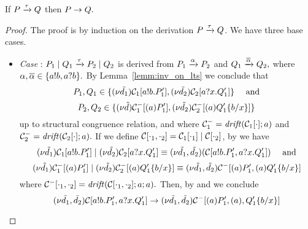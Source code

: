 \begin{lemma}{\label{lemm:tau_reduction}}
If $P\xrightarrow{\tau}Q$ then $P\rightarrow Q.$
\end{lemma}
\begin{proof}
The proof is by induction on the derivation $P\xrightarrow{\tau}Q$. We have three base cases.
\begin{itemize}
\item \emph{Case} : $P_1\;|\;Q_1\xrightarrow{\tau}P_2\;|\;Q_2$ is derived from $P_1\xrightarrow{\alpha}P_2$ and $Q_1\xrightarrow{\overline{\alpha}}Q_2,$ where $\alpha,\overline{\alpha}\in\{a!b, a?b\}.$ By Lemma~\ref{lemm:inv_on_lts} we conclude that
\[
P_1,Q_1\in\{(\nu \tilde {d_1})\mathcal{C}_1[a!b.P_1'], (\nu \tilde {d_2})\mathcal{C}_2[a?x.Q_1'] \} \quad\text{ and}
\]
\[
P_2,Q_2\in\{(\nu \tilde {d})\mathcal{C}_1^-[(a)P_1'], (\nu \tilde {d_2})\mathcal{C}_2^-[(a)Q_1'\{b/x\}]\}
\]
up to structural congruence relation, and where $\mathcal{C}_1^-=\mathit {drift}(\mathcal{C}_1[\cdot]; a)$ and $\mathcal{C}_2^-=\mathit {drift}(\mathcal{C}_2[\cdot]; a).$
If we define $\mathcal{C}[\cdot_1, \cdot_2]=\mathcal{C}_1[\cdot_1]\;|\; \mathcal{C}[\cdot_2]$, by  we have
 \[
 (\nu \tilde {d_1})\mathcal{C}_1[a!b.P_1']\;|\; (\nu \tilde {d_2})\mathcal{C}_2[a?x.Q_1'] \equiv (\nu \tilde {d_1},\tilde {d_2})(\mathcal{C}[a!b.P_1', a?x.Q_1']) \quad\text{ and}
 \]
 \[(\nu \tilde {d_1})\mathcal{C}_1^-[(a)P_1']\;|\; (\nu \tilde {d_2})\mathcal{C}_2^-[(a)Q_1'\{b/x\}]\equiv (\nu \tilde {d_1},\tilde {d_2})\mathcal{C}^-[(a)P_1',(a)Q_1'\{b/x\}]
 \]
 where  $\mathcal{C}^-[\cdot_1, \cdot_2]=\mathit {drift}(\mathcal{C}[\cdot_1, \cdot_2];a;a).$
 Then, by  and  we conclude 
\[
(\nu \tilde {d_1},\tilde {d_2})\mathcal{C}[a!b.P_1', a?x.Q_1']\rightarrow (\nu \tilde {d_1},\tilde {d_2})\mathcal{C}^-[(a)P_1',(a), Q_1'\{b/x\}]
\]
% 

\end{itemize}
\end{proof}

